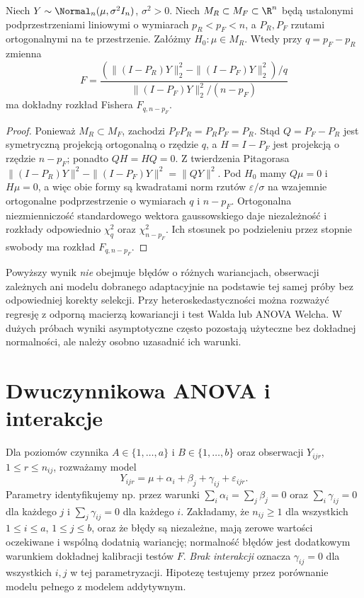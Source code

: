 \begin{twierdzenie}\label{thm:nested-F-anova}
Niech $Y\sim\Normal_n(\mu,\sigma^2 I_n)$, $\sigma^2>0$. Niech $M_R\subset M_F\subset\R^n$ będą ustalonymi podprzestrzeniami liniowymi o wymiarach $p_R<p_F<n$, a $P_R,P_F$ rzutami ortogonalnymi na te przestrzenie. Załóżmy $H_0:\mu\in M_R$. Wtedy przy $q=p_F-p_R$ zmienna
\[
 F=\frac{(\|(I-P_R)Y\|_2^2-\|(I-P_F)Y\|_2^2)/q}{\|(I-P_F)Y\|_2^2/(n-p_F)}
\]
ma dokładny rozkład Fishera $F_{q,n-p_F}$.
\end{twierdzenie}
\begin{proof}
Ponieważ $M_R\subset M_F$, zachodzi $P_FP_R=P_RP_F=P_R$. Stąd $Q=P_F-P_R$ jest symetryczną projekcją ortogonalną o rzędzie $q$, a $H=I-P_F$ jest projekcją o rzędzie $n-p_F$; ponadto $QH=HQ=0$. Z twierdzenia Pitagorasa $\|(I-P_R)Y\|^2-\|(I-P_F)Y\|^2=\|QY\|^2$. Pod $H_0$ mamy $Q\mu=0$ i $H\mu=0$, a więc obie formy są kwadratami norm rzutów $\varepsilon/\sigma$ na wzajemnie ortogonalne podprzestrzenie o wymiarach $q$ i $n-p_F$. Ortogonalna niezmienniczość standardowego wektora gaussowskiego daje niezależność i rozkłady odpowiednio $\chi_q^2$ oraz $\chi_{n-p_F}^2$. Ich stosunek po podzieleniu przez stopnie swobody ma rozkład $F_{q,n-p_F}$.
\end{proof}

\begin{uwaga}
Powyższy wynik \emph{nie} obejmuje błędów o różnych wariancjach, obserwacji zależnych ani modelu dobranego adaptacyjnie na podstawie tej samej próby bez odpowiedniej korekty selekcji. Przy heteroskedastyczności można rozważyć regresję z odporną macierzą kowariancji i test Walda lub ANOVA Welcha. W dużych próbach wyniki asymptotyczne często pozostają użyteczne bez dokładnej normalności, ale należy osobno uzasadnić ich warunki.
\end{uwaga}

\section{Dwuczynnikowa ANOVA i interakcje}
\begin{definicja}\label{def:two-way-anova}
Dla poziomów czynnika $A\in\{1,\ldots,a\}$ i $B\in\{1,\ldots,b\}$ oraz obserwacji $Y_{ijr}$, $1\le r\le n_{ij}$, rozważamy model
\[
 Y_{ijr}=\mu+\alpha_i+\beta_j+\gamma_{ij}+\varepsilon_{ijr}.
\]
Parametry identyfikujemy np. przez warunki $\sum_i\alpha_i=\sum_j\beta_j=0$ oraz $\sum_i\gamma_{ij}=0$ dla każdego $j$ i $\sum_j\gamma_{ij}=0$ dla każdego $i$. Zakładamy, że $n_{ij}\ge1$ dla wszystkich $1\le i\le a$, $1\le j\le b$, oraz że błędy są niezależne, mają zerowe wartości oczekiwane i wspólną dodatnią wariancję; normalność błędów jest dodatkowym warunkiem dokładnej kalibracji testów $F$. \emph{Brak interakcji} oznacza $\gamma_{ij}=0$ dla wszystkich $i,j$ w tej parametryzacji. Hipotezę testujemy przez porównanie modelu pełnego z modelem addytywnym.
\end{definicja}

